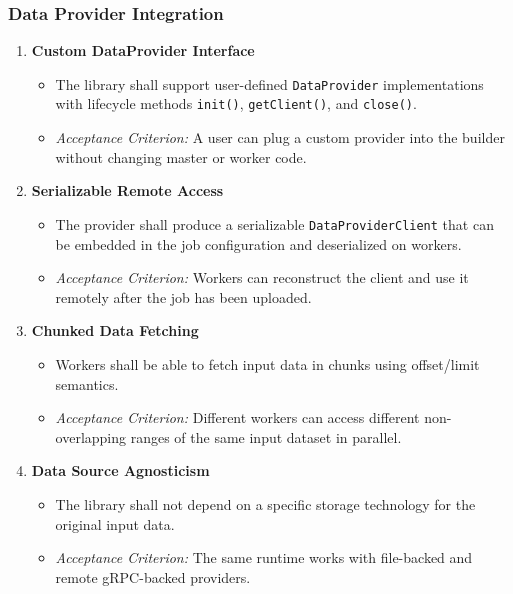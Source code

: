 \documentclass{scrartcl}
\begin{document}
\subsubsection{Data Provider Integration}

\begin{enumerate}[label=\textbf{FR-DP-\arabic*}]
    \item \textbf{Custom DataProvider Interface}
          \begin{itemize}
              \item The library shall support user-defined \texttt{DataProvider} implementations with lifecycle methods \texttt{init()}, \texttt{getClient()}, and \texttt{close()}.
              \item \textit{Acceptance Criterion:} A user can plug a custom provider into the builder without changing master or worker code.
          \end{itemize}

    \item \textbf{Serializable Remote Access}
          \begin{itemize}
              \item The provider shall produce a serializable \texttt{DataProviderClient} that can be embedded in the job configuration and deserialized on workers.
              \item \textit{Acceptance Criterion:} Workers can reconstruct the client and use it remotely after the job has been uploaded.
          \end{itemize}

    \item \textbf{Chunked Data Fetching}
          \begin{itemize}
              \item Workers shall be able to fetch input data in chunks using offset/limit semantics.
              \item \textit{Acceptance Criterion:} Different workers can access different non-overlapping ranges of the same input dataset in parallel.
          \end{itemize}

    \item \textbf{Data Source Agnosticism}
          \begin{itemize}
              \item The library shall not depend on a specific storage technology for the original input data.
              \item \textit{Acceptance Criterion:} The same runtime works with file-backed and remote gRPC-backed providers.
          \end{itemize}
\end{enumerate}
\end{document}

